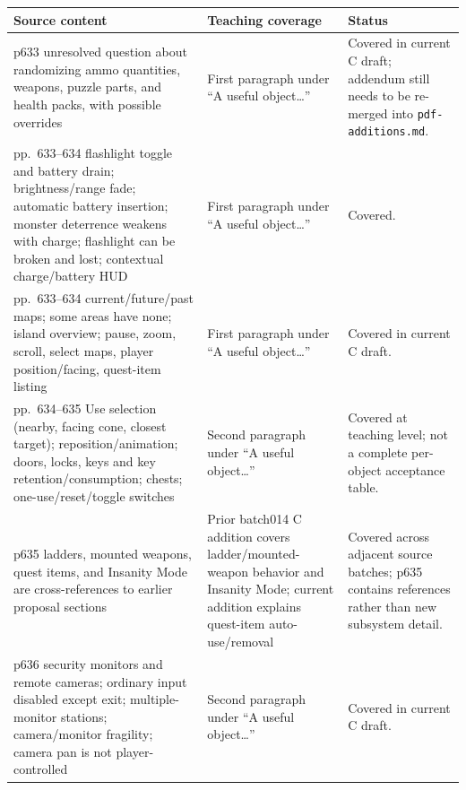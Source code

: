 {\def\LTcaptype{none} %
\begin{longtable}[]{@{}
  >{\raggedright\arraybackslash}p{}
  >{\raggedright\arraybackslash}p{}
  >{\raggedright\arraybackslash}p{}@{}}
\toprule\noalign{}
\begin{minipage}[b]{\linewidth}\raggedright
Source content
\end{minipage} & \begin{minipage}[b]{\linewidth}\raggedright
Teaching coverage
\end{minipage} & \begin{minipage}[b]{\linewidth}\raggedright
Status
\end{minipage} \\
\midrule\noalign{}
\endhead
\bottomrule\noalign{}
\endlastfoot
p633 unresolved question about randomizing ammo quantities, weapons, puzzle parts, and health packs, with possible overrides & First paragraph under ``A useful object\ldots'' & Covered in current C draft; addendum still needs to be re-merged into \texttt{pdf-additions.md}. \\
pp.~633--634 flashlight toggle and battery drain; brightness/range fade; automatic battery insertion; monster deterrence weakens with charge; flashlight can be broken and lost; contextual charge/battery HUD & First paragraph under ``A useful object\ldots'' & Covered. \\
pp.~633--634 current/future/past maps; some areas have none; island overview; pause, zoom, scroll, select maps, player position/facing, quest-item listing & First paragraph under ``A useful object\ldots'' & Covered in current C draft. \\
pp.~634--635 Use selection (nearby, facing cone, closest target); reposition/animation; doors, locks, keys and key retention/consumption; chests; one-use/reset/toggle switches & Second paragraph under ``A useful object\ldots'' & Covered at teaching level; not a complete per-object acceptance table. \\
p635 ladders, mounted weapons, quest items, and Insanity Mode are cross-references to earlier proposal sections & Prior batch014 C addition covers ladder/mounted-weapon behavior and Insanity Mode; current addition explains quest-item auto-use/removal & Covered across adjacent source batches; p635 contains references rather than new subsystem detail. \\
p636 security monitors and remote cameras; ordinary input disabled except exit; multiple-monitor stations; camera/monitor fragility; camera pan is not player-controlled & Second paragraph under ``A useful object\ldots'' & Covered in current C draft. \\

\end{longtable}}
